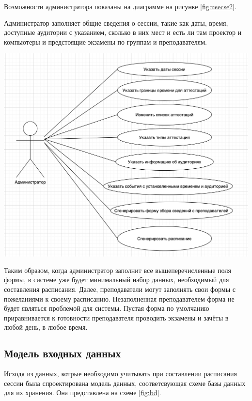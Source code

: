 Возможности администратора показаны на диаграмме на рисунке \ref{fig:usecse2}.

Администратор заполняет общие сведения о сессии, такие как даты, время, доступные аудитории с указанием, сколько в них мест и есть ли там проектор и компьютеры и предстоящие экзамены по группам и преподавателям. 

\begin{minipage}{\textwidth}
	\centering
	\vspace{\mfloatsep} %
	\includegraphics[keepaspectratio=true,scale=0.7] {my_folder/images//usecase2}
	\label{fig:usecse2}  
	\vspace{\mfloatsep} %
\end{minipage}

Таким образом, когда администратор заполнит все вышеперечисленные поля формы, в системе уже будет минимальный набор данных, необходимый для составления расписания. Далее, преподаватели могут заполнять свои формы с пожеланиями к своему расписанию. Незаполненная преподавателем форма не будет являться проблемой для системы. Пустая форма по умолчанию приравнивается к готовности преподавателя проводить экзамены и зачёты в любой день, в любое время.

\subsection{Модель входных данных} \label{ch1:sec1:sub3}
Исходя из данных, котрые необходимо учитывать при составлении расписания сессии была спроектирована модель данных, соответсвующая схеме базы данных для их хранения. Она представлена на схеме \ref{fig:bd}.

